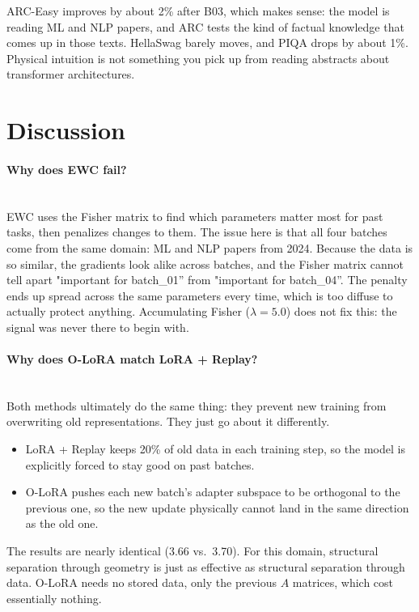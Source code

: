 \documentclass[11pt,a4paper]{article}
\begin{document}
ARC-Easy improves by about 2\% after B03, which makes sense: the model is reading ML and NLP papers, and ARC tests the kind of factual knowledge that comes up in those texts. HellaSwag barely moves, and PIQA drops by about 1\%. Physical intuition is not something you pick up from reading abstracts about transformer architectures.

\section{Discussion}

\paragraph{Why does EWC fail?} \mbox{}\\
EWC uses the Fisher matrix to find which parameters matter most for past tasks, then penalizes changes to them. The issue here is that all four batches come from the same domain: ML and NLP papers from 2024. Because the data is so similar, the gradients look alike across batches, and the Fisher matrix cannot tell apart "important for batch\_01'' from "important for batch\_04''. The penalty ends up spread across the same parameters every time, which is too diffuse to actually protect anything. Accumulating Fisher ($\lambda=5.0$) does not fix this: the signal was never there to begin with.

\paragraph{Why does O-LoRA match LoRA + Replay?} \mbox{}\\
Both methods ultimately do the same thing: they prevent new training from overwriting old representations. They just go about it differently.
\begin{itemize}
    \item LoRA + Replay keeps 20\% of old data in each training step, so the model is explicitly forced to stay good on past batches.
    \item O-LoRA pushes each new batch's adapter subspace to be orthogonal to the previous one, so the new update physically cannot land in the same direction as the old one.
\end{itemize}
The results are nearly identical (3.66 vs.\ 3.70). For this domain, structural separation through geometry is just as effective as structural separation through data. O-LoRA needs no stored data, only the previous $A$ matrices, which cost essentially nothing.
\end{document}
